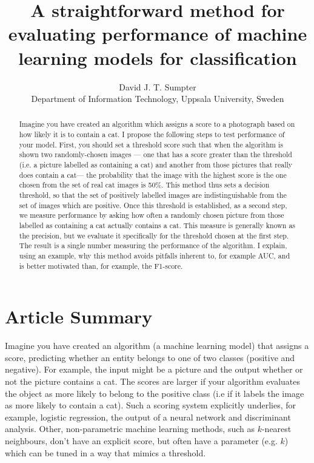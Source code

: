 \documentclass[preprint,12pt]{article}
\title{A straightforward method for evaluating performance of machine learning models for classification}
\author{David J. T. Sumpter \\ Department of Information Technology, Uppsala University, Sweden}
\begin{document}

\maketitle

\begin{abstract}
Imagine you have created an algorithm which assigns a score to a photograph based on how likely it is to contain a cat.  I propose the following steps to test performance of your model. First, you should set a threshold score such that when the algorithm is shown two randomly-chosen images --- one that has a score greater than the threshold (i.e. a picture labelled as containing a cat) and another from those pictures that really does contain a cat--- the probability that the image with the highest score is the one chosen from the set of real cat images is 50\%. This method thus sets a decision threshold, so that the set of positively labelled images are indistinguishable from the set of images which are positive. Once this threshold is established, as a second step, we measure performance by asking how often a randomly chosen picture from those labelled as containing a cat actually contains a cat. This measure is generally known as the precision, but we evaluate it specifically for the threshold chosen at the first step. The result is a single number measuring the performance of the algorithm. I explain, using an example, why this method avoids pitfalls inherent to, for example AUC, and is better motivated than, for example, the F1-score.
\end{abstract}

\section{Article Summary}

Imagine you have created an algorithm (a machine learning model) that assigns a score, predicting whether an entity belongs to one of two classes (positive and negative). For example, the input might be a picture and the output whether or not the picture contains a cat. The scores are larger if your algorithm evaluates the object as more likely to belong to the positive class (i.e if it labels the image as more likely to contain a cat). Such a scoring system explicitly underlies, for example, logistic regression, the output of a neural network and discriminant analysis. Other, non-parametric machine learning methods, such as $k$-nearest neighbours, don't have an explicit score, but often have a parameter (e.g. $k$) which can be tuned in a way that mimics a threshold. 
\end{document}
